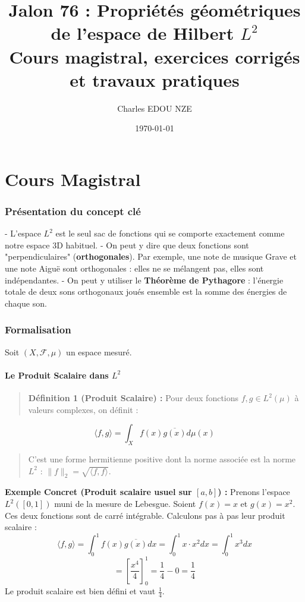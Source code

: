 \documentclass[11pt,a4paper]{article}
\title{\Huge Jalon 76 : Propriétés géométriques de l'espace de Hilbert $L^2$ \\ \large Cours magistral, exercices corrigés et travaux pratiques}
\author{\Large Charles EDOU NZE}
\date{\today}
\begin{document}
\maketitle
\tableofcontents
\newpage

\part{Cours Magistral}



\section{Présentation du concept clé}

    - L'espace \textbf{$L^2$} est le seul sac de fonctions qui se comporte exactement comme notre espace 3D habituel.
    - On peut y dire que deux fonctions sont "perpendiculaires" (\textbf{orthogonales}). Par exemple, une note de musique Grave et une note Aiguë sont orthogonales : elles ne se mélangent pas, elles sont indépendantes.
    - On peut y utiliser le \textbf{Théorème de Pythagore} : l'énergie totale de deux sons orthogonaux joués ensemble est la somme des énergies de chaque son.

\section{Formalisation}

Soit $(X, \mathcal{F}, \mu)$ un espace mesuré.

\subsection{Le Produit Scalaire dans $L^2$}

\begin{quote}\textbf{Définition 1 (Produit Scalaire) :}
Pour deux fonctions $f, g \in L^2(\mu)$ à valeurs complexes, on définit :
\end{quote}$$\langle f, g \rangle = \int_X f(x) \overline{g(x)} d\mu(x)$$
\begin{quote}C'est une forme hermitienne positive dont la norme associée est la norme $L^2$ : $\|f\|_2 = \sqrt{\langle f, f \rangle}$.\end{quote}

\textbf{Exemple Concret (Produit scalaire usuel sur $[a,b]$) :}
Prenons l'espace $L^2([0,1])$ muni de la mesure de Lebesgue.
Soient $f(x) = x$ et $g(x) = x^2$. Ces deux fonctions sont de carré intégrable.
Calculons pas à pas leur produit scalaire :
$$ \langle f, g \rangle = \int_0^1 f(x) \overline{g(x)} dx = \int_0^1 x \cdot x^2 dx = \int_0^1 x^3 dx $$
$$ = \left[ \frac{x^4}{4} \right]_0^1 = \frac{1}{4} - 0 = \frac{1}{4} $$
Le produit scalaire est bien défini et vaut $\frac{1}{4}$.
\end{document}
